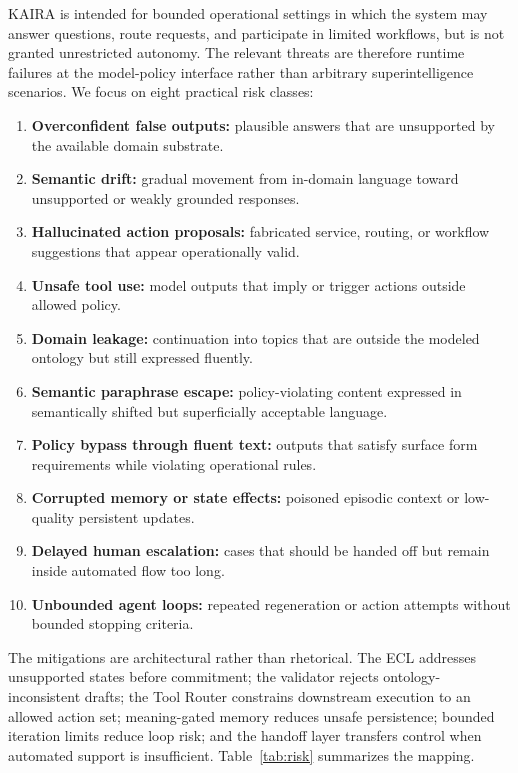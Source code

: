 \documentclass[11pt,a4paper]{article}
\begin{document}
KAIRA is intended for bounded operational settings in which the system may answer questions, route requests, and participate in limited workflows, but is not granted unrestricted autonomy. The relevant threats are therefore runtime failures at the model-policy interface rather than arbitrary superintelligence scenarios. We focus on eight practical risk classes:
\begin{enumerate}
  \item \textbf{Overconfident false outputs:} plausible answers that are unsupported by the available domain substrate.
  \item \textbf{Semantic drift:} gradual movement from in-domain language toward unsupported or weakly grounded responses.
  \item \textbf{Hallucinated action proposals:} fabricated service, routing, or workflow suggestions that appear operationally valid.
  \item \textbf{Unsafe tool use:} model outputs that imply or trigger actions outside allowed policy.
  \item \textbf{Domain leakage:} continuation into topics that are outside the modeled ontology but still expressed fluently.
  \item \textbf{Semantic paraphrase escape:} policy-violating content expressed in semantically shifted but superficially acceptable language.
  \item \textbf{Policy bypass through fluent text:} outputs that satisfy surface form requirements while violating operational rules.
  \item \textbf{Corrupted memory or state effects:} poisoned episodic context or low-quality persistent updates.
  \item \textbf{Delayed human escalation:} cases that should be handed off but remain inside automated flow too long.
  \item \textbf{Unbounded agent loops:} repeated regeneration or action attempts without bounded stopping criteria.
\end{enumerate}

The mitigations are architectural rather than rhetorical. The ECL addresses unsupported states before commitment; the validator rejects ontology-inconsistent drafts; the Tool Router constrains downstream execution to an allowed action set; meaning-gated memory reduces unsafe persistence; bounded iteration limits reduce loop risk; and the handoff layer transfers control when automated support is insufficient. Table~\ref{tab:risk} summarizes the mapping.
\end{document}
